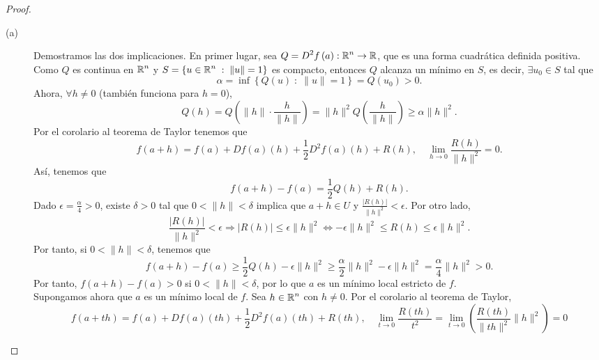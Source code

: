 \begin{proof}
\begin{description}
	\item[(a)] Demostramos las dos implicaciones. En primer lugar, sea $\displaystyle Q = D^{2}f\left(a\right) : \mathbb{R}^{n} \to \mathbb{R} $, que es una forma cuadrática definida positiva. Como $\displaystyle Q $ es continua en $\displaystyle \mathbb{R}^{n} $ y $\displaystyle S = \left\{ u  \in \mathbb{R}^{n} \; : \; \|u\|=1\right\}  $ es compacto, entonces $\displaystyle Q $ alcanza un mínimo en $\displaystyle S $, es decir, $\displaystyle \exists u_{0} \in S $ tal que 
		\[\alpha = \inf \left\{ Q\left(u\right) \; : \; \|u\| = 1\right\}  = Q\left(u_{0}\right) > 0 .\]
	Ahora, $\displaystyle \forall h \neq 0 $ (también funciona para $\displaystyle h = 0 $),
	\[Q\left(h\right) = Q\left( \|h\| \cdot \frac{h}{\|h\|}\right) = \|h\|^{2} Q\left(\frac{h}{\|h\|}\right) \geq \alpha \|h\|^{2} .\]
	Por el corolario al teorema de Taylor tenemos que
	\[f\left(a+h\right) = f\left(a\right) + Df\left(a\right)\left(h\right) + \frac{1}{2}D^{2}f\left(a\right)\left(h\right) + R\left(h\right), \quad \lim_{h \to 0}\frac{R\left(h\right)}{\|h\|^{2}}=0 .\]
	Así, tenemos que 
	\[f\left(a+h\right)-f\left(a\right) = \frac{1}{2}Q\left(h\right)+R\left(h\right) .\]
	Dado $\displaystyle \epsilon = \frac{\alpha }{4} > 0 $, existe $\displaystyle \delta > 0 $ tal que $\displaystyle 0 < \|h\| < \delta  $ implica que $\displaystyle a+h \in U $ y $\displaystyle \frac{ \left|R\left(h\right)\right|}{\|h\|^{2}} < \epsilon  $. Por otro lado, 
	\[\frac{ \left|R\left(h\right)\right|}{\|h\|^{2}} < \epsilon \Rightarrow \left|R\left(h\right)\right| \leq \epsilon \|h\|^{2} \iff -\epsilon \|h\|^{2} \leq R\left(h\right) \leq
	 \epsilon \|h\|^{2} .\]
Por tanto, si $\displaystyle 0 < \|h\| < \delta  $, tenemos que 
\[f\left(a+h\right)-f\left(a\right) \geq \frac{1}{2}Q\left(h\right) - \epsilon \|h\|^{2} \geq \frac{\alpha }{2}\|h\|^{2}-\epsilon \|h\|^{2} = \frac{\alpha }{4}\|h\|^{2} > 0 .\]
Por tanto, $\displaystyle f\left(a+h\right)-f\left(a\right) > 0 $ si $\displaystyle 0 < \|h\| < \delta  $, por lo que $\displaystyle a  $ es un mínimo local estricto de $\displaystyle f $. \\ 
Supongamos ahora que $\displaystyle a $ es un mínimo local de $\displaystyle f $. Sea $\displaystyle h \in \mathbb{R}^{n} $ con $\displaystyle h \neq 0 $. Por el corolario al teorema de Taylor, 
\[f\left(a+th\right) = f\left(a\right) + Df\left(a\right)\left(th\right) + \frac{1}{2}D^{2}f\left(a\right)\left(th\right) + R\left(th\right) , \quad \lim_{t \to 0}\frac{R\left(th\right)}{t ^{2}} = \lim_{t \to 0}\left(\frac{R\left(th\right)}{\|th\|^{2}} \|h\|^{2}\right) = 0\]

\end{description}
\end{proof}
